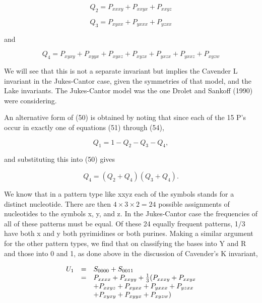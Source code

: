 \begin{equation}
Q_2 = P_{xxxy} + P_{xxyx} + P_{xxyz}
\end{equation}

\begin{equation}
Q_3 = P_{xyxx} + P_{yxxx} + P_{yzxx}
\end{equation}

and

\begin{equation}
Q_4 = P_{xyxy} + P_{xyyx} + P_{xyxz} + P_{xyzx} + P_{yxzx} + P_{yxxz} + 
P_{xyzw}
\end{equation}

We will see that this is not a separate invariant but implies the Cavender
L invariant in the Jukes-Cantor case, given the symmetries of that model,
and the Lake invariants.  The Jukes-Cantor model was the
one Drolet and Sankoff (1990) were considering.

An alternative form of (50) is obtained by noting that since each of the 15
P's occur in exactly one of equations (51) through (54),

\begin{equation}
Q_1 = 1 - Q_2 - Q_3 - Q_4,
\end{equation}

and substituting this into (50) gives 

\begin{equation}
Q_4 = (Q_2 + Q_4)(Q_3 + Q_4).
\end{equation}

We know that in a pattern type like xxyz each of the symbols stands for a
distinct nucleotide.  There are then $4 \times 3 \times 2 = 24$ possible
assignments of nucleotides to the symbols x, y, and z.  In the Jukes-Cantor
case the frequencies of all of these patterns must be equal.  Of these 24
equally frequent patterns, 1/3 have both x and y both pyrimidines or both
purines.  Making a similar argument for the other pattern types,
we find that on classifying the bases into Y and R and those into 0 and 1,
as done above in the discussion of Cavender's K invariant,

\begin{equation}
\begin{array}{c c l}
U_1 & = & S_{0000} + S_{0011}\\
    & = & P_{xxxx} + P_{xxyy} + {1 \over 3} (P_{xxxy} + P_{xxyx}\\
    &   & +P_{xxyz}+P_{xyxx}+P_{yxxx}+P_{yzxx}\\
    &   & +P_{xyxy}+P_{xyyx}+P_{xyzw}) 
\end{array}
\end{equation}

